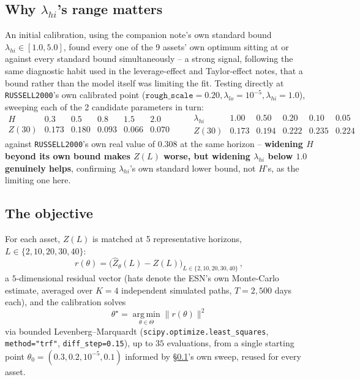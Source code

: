 \documentclass[11pt]{article}
\begin{document}
\subsection{Why $\lambda_{hi}$'s range matters}
\label{sec:whylh}
An initial calibration, using the companion note's own standard bound
$\lambda_{hi}\in[1.0,5.0]$, found every one of the 9 assets' own optimum
sitting at or against every standard bound simultaneously -- a strong signal,
following the same diagnostic habit used in the leverage-effect and
Taylor-effect notes, that a bound rather than the model itself was limiting
the fit. Testing directly at \texttt{RUSSELL2000}'s own calibrated point
($\texttt{rough\_scale}=0.20,\lambda_{lo}=10^{-5},\lambda_{hi}=1.0$), sweeping
each of the 2 candidate parameters in turn:
\[
\begin{array}{lccccc}
H & 0.3 & 0.5 & 0.8 & 1.5 & 2.0 \\
Z(30) & 0.173 & 0.180 & 0.093 & 0.066 & 0.070
\end{array}
\qquad
\begin{array}{lccccc}
\lambda_{hi} & 1.00 & 0.50 & 0.20 & 0.10 & 0.05 \\
Z(30) & 0.173 & 0.194 & 0.222 & 0.235 & 0.224
\end{array}
\]
against \texttt{RUSSELL2000}'s own real value of $0.308$ at the same horizon
-- \textbf{widening $H$ beyond its own bound makes $Z(L)$ worse, but widening
$\lambda_{hi}$ below $1.0$ genuinely helps}, confirming $\lambda_{hi}$'s own
standard lower bound, not $H$'s, as the limiting one here.

\subsection{The objective}
For each asset, $Z(L)$ is matched at 5 representative horizons,
$L\in\{2,10,20,30,40\}$:
\begin{equation}
r(\theta) = \Big(\widehat{Z}_\theta(L) - Z(L)\Big)_{L\in\{2,10,20,30,40\}}\, ,
\label{eq:zumbachres}
\end{equation}
a $5$-dimensional residual vector (hats denote the ESN's own Monte-Carlo
estimate, averaged over $K=4$ independent simulated paths, $T=2{,}500$ days
each), and the calibration solves
\begin{equation}
\theta^\star = \operatorname*{arg\,min}_{\theta\in\Theta}
\big\lVert r(\theta) \big\rVert^2
\label{eq:zumbachargmin}
\end{equation}
via bounded Levenberg--Marquardt (\texttt{scipy.optimize.least\_squares},
\texttt{method="trf"}, \texttt{diff\_step=0.15}), up to $35$ evaluations, from
a single starting point $\theta_0=(0.3,0.2,10^{-5},0.1)$ informed by
\S\ref{sec:whylh}'s own sweep, reused for every asset.
\end{document}
